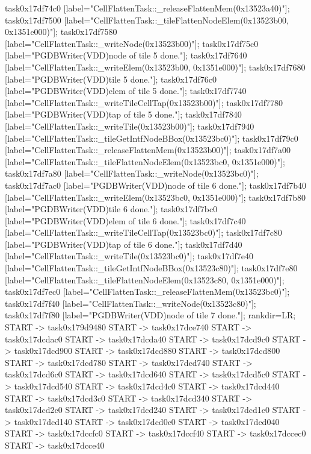 {	task0x17df74c0 [label="CellFlattenTask::_releaseFlattenMem(0x13523a40)"];
	task0x17df7500 [label="CellFlattenTask::_tileFlattenNodeElem(0x13523b00, 0x1351e000)"];
	task0x17df7580 [label="CellFlattenTask::_writeNode(0x13523b00)"];
	task0x17df75c0 [label="PGDBWriter(VDD)\nCell node of tile 5 done."];
	task0x17df7640 [label="CellFlattenTask::_writeElem(0x13523b00, 0x1351e000)"];
	task0x17df7680 [label="PGDBWriter(VDD)\nCell tile 5 done."];
	task0x17df76c0 [label="PGDBWriter(VDD)\nCell elem of tile 5 done."];
	task0x17df7740 [label="CellFlattenTask::_writeTileCellTap(0x13523b00)"];
	task0x17df7780 [label="PGDBWriter(VDD)\nCell tap of tile 5 done."];
	task0x17df7840 [label="CellFlattenTask::_writeTile(0x13523b00)"];
	task0x17df7940 [label="CellFlattenTask::_tileGetIntfNodeBBox(0x13523bc0)"];
	task0x17df79c0 [label="CellFlattenTask::_releaseFlattenMem(0x13523b00)"];
	task0x17df7a00 [label="CellFlattenTask::_tileFlattenNodeElem(0x13523bc0, 0x1351e000)"];
	task0x17df7a80 [label="CellFlattenTask::_writeNode(0x13523bc0)"];
	task0x17df7ac0 [label="PGDBWriter(VDD)\nCell node of tile 6 done."];
	task0x17df7b40 [label="CellFlattenTask::_writeElem(0x13523bc0, 0x1351e000)"];
	task0x17df7b80 [label="PGDBWriter(VDD)\nCell tile 6 done."];
	task0x17df7bc0 [label="PGDBWriter(VDD)\nCell elem of tile 6 done."];
	task0x17df7c40 [label="CellFlattenTask::_writeTileCellTap(0x13523bc0)"];
	task0x17df7c80 [label="PGDBWriter(VDD)\nCell tap of tile 6 done."];
	task0x17df7d40 [label="CellFlattenTask::_writeTile(0x13523bc0)"];
	task0x17df7e40 [label="CellFlattenTask::_tileGetIntfNodeBBox(0x13523c80)"];
	task0x17df7e80 [label="CellFlattenTask::_tileFlattenNodeElem(0x13523c80, 0x1351e000)"];
	task0x17df7ec0 [label="CellFlattenTask::_releaseFlattenMem(0x13523bc0)"];
	task0x17df7f40 [label="CellFlattenTask::_writeNode(0x13523c80)"];
	task0x17df7f80 [label="PGDBWriter(VDD)\nCell node of tile 7 done."];
	rankdir=LR;
	START -> task0x179d9480
	START -> task0x17dce740
	START -> task0x17dcdac0
	START -> task0x17dcda40
	START -> task0x17dcd9c0
	START -> task0x17dcd900
	START -> task0x17dcd880
	START -> task0x17dcd800
	START -> task0x17dcd780
	START -> task0x17dcd740
	START -> task0x17dcd6c0
	START -> task0x17dcd640
	START -> task0x17dcd5c0
	START -> task0x17dcd540
	START -> task0x17dcd4c0
	START -> task0x17dcd440
	START -> task0x17dcd3c0
	START -> task0x17dcd340
	START -> task0x17dcd2c0
	START -> task0x17dcd240
	START -> task0x17dcd1c0
	START -> task0x17dcd140
	START -> task0x17dcd0c0
	START -> task0x17dcd040
	START -> task0x17dccfc0
	START -> task0x17dccf40
	START -> task0x17dccec0
	START -> task0x17dcce40
}

